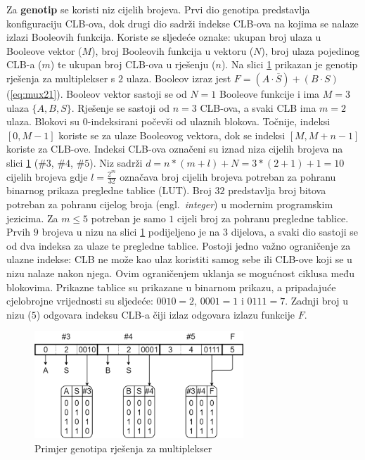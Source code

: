 \documentclass[times, utf8, diplomski]{fer}
\begin{document}
Za \textbf{genotip} se koristi niz cijelih brojeva. Prvi dio genotipa predstavlja konfiguraciju CLB-ova, dok drugi dio sadrži indekse CLB-ova na kojima se nalaze izlazi Booleovih funkcija. Koriste se sljedeće oznake: ukupan broj ulaza u Booleove vektor ($M$), broj Booleovih funkcija u vektoru ($N$), broj ulaza pojedinog CLB-a ($m$) te ukupan broj CLB-ova u rješenju ($n$). Na slici \ref{fig:genotype} prikazan je genotip rješenja za multiplekser s $2$ ulaza. Booleov izraz jest $F = (A \cdot \overline{S}) + (B \cdot S)$ (\ref{eq:mux21}). Booleov vektor sastoji se od $N=1$ Booleove funkcije i ima $M=3$ ulaza $\{A, B, S\}$. Rješenje se sastoji od $n=3$ CLB-ova, a svaki CLB ima $m=2$ ulaza. Blokovi su $0$-indeksirani počevši od ulaznih blokova. Točnije, indeksi $[0, M-1]$ koriste se za ulaze Booleovog vektora, dok se indeksi $[M, M+n-1]$ koriste za CLB-ove. Indeksi CLB-ova označeni su iznad niza cijelih brojeva na slici \ref{fig:genotype} ($\#3$, $\#4$, $\#5$). Niz sadrži $d=n*(m+l)+N=3*(2+1)+1=10$ cijelih brojeva gdje $l=\frac{2^{m}}{32}$ označava broj cijelih brojeva potreban za pohranu binarnog prikaza pregledne tablice (LUT). Broj $32$ predstavlja broj bitova potreban za pohranu cijelog broja (engl.~\textit{integer}) u modernim programskim jezicima. Za $m \leq 5$ potreban je samo $1$ cijeli broj za pohranu pregledne tablice. Prvih $9$ brojeva u nizu na slici \ref{fig:genotype} podijeljeno je na $3$ dijelova, a svaki dio sastoji se od dva indeksa za ulaze te pregledne tablice. Postoji jedno važno ograničenje za ulazne indekse: CLB ne može kao ulaz koristiti samog sebe ili CLB-ove koji se u nizu nalaze nakon njega. Ovim ograničenjem uklanja se mogućnost ciklusa među blokovima. Prikazne tablice su prikazane u binarnom prikazu, a pripadajuće cjelobrojne vrijednosti su sljedeće: $0010=2$, $0001=1$ i $0111=7$. Zadnji broj u nizu ($5$) odgovara indeksu CLB-a čiji izlaz odgovara izlazu funkcije $F$.

\begin{figure}[htb]
	\centering
	\includegraphics[width=0.7\textwidth]{img/genotype.png}
	\caption{Primjer genotipa rješenja za multiplekser}
	\label{fig:genotype}
\end{figure}
\end{document}

